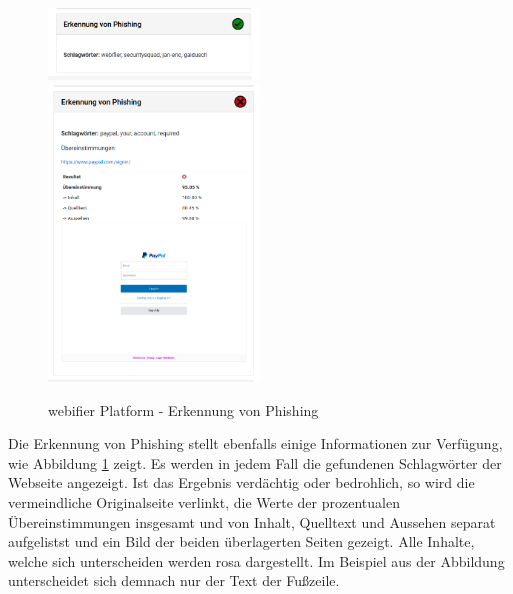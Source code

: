 \begin{figure}[H]
\centerline{%
\includegraphics[width=0.5\textwidth]{images/platform/phishing-clean}%
\includegraphics[width=0.5\textwidth]{images/platform/phishing-malicious}%
}%
\caption{webifier Platform - Erkennung von Phishing}
\label{fig:platform-result-phishingdetector}
\end{figure}

Die Erkennung von Phishing stellt ebenfalls einige Informationen zur Verfügung, wie Abbildung \ref{fig:platform-result-phishingdetector} zeigt. Es werden in jedem Fall die gefundenen Schlagwörter der Webseite angezeigt. Ist das Ergebnis verdächtig oder bedrohlich, so wird die vermeindliche Originalseite verlinkt, die Werte der prozentualen Übereinstimmungen insgesamt und von Inhalt, Quelltext und Aussehen separat aufgelistst und ein Bild der beiden überlagerten Seiten gezeigt. Alle Inhalte, welche sich unterscheiden werden rosa dargestellt. Im Beispiel aus der Abbildung unterscheidet sich demnach nur der Text der Fußzeile.

